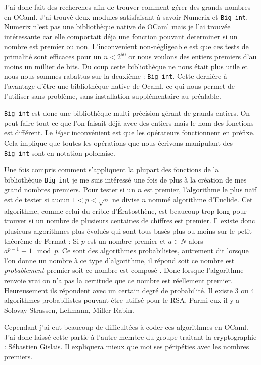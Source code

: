 \documentclass[a4paper,12pt]{article}
\begin{document}
J'ai donc fait des recherches afin de trouver comment gérer des grands nombres en OCaml. J'ai trouvé deux modules satisfaisant à savoir Numerix et \texttt{Big\_int}. Numerix n'est pas une bibliothèque native de OCaml mais je l'ai trouvée intéressante car elle comportait déja une fonction pouvant determiner si un nombre est premier ou non. L'inconvenient non-négligeable est que ces tests de primalité sont efficaces pour un $n < 2^{50}$ or nous voulons des entiers premiers d'au moins un millier de bits. Du coup cette bibliothèque ne nous était plus utile et nous nous sommes rabattus sur la deuxième : \texttt{Big\_int}. Cette dernière à l'avantage d'être une bibliothèque native de Ocaml, ce qui nous permet de l'utiliser sans problème, sans installation supplémentaire au préalable.

\texttt{Big\_int} est donc une bibliothèque multi-précision gérant de grands entiers. On peut faire tout ce que l'on faisait déjà avec des entiers mais le nom des fonctions est différent. Le \emph{léger} inconvénient est que les opérateurs fonctionnent en préfixe. Cela implique que toutes les opérations que nous écrivons manipulant des \texttt{Big\_int} sont en notation polonaise.

Une fois compris comment s'appliquent la plupart des fonctions de la bibliothèque \texttt{Big\_int} je me suis intéressé une fois de plus à la création de mes grand nombres premiers. Pour tester si un $n$ est premier, l'algorithme le plus naïf est de tester si aucun $1 < p < \sqrt{n}$ ne divise $n$ nommé algorithme d'Euclide. Cet algorithme, comme celui  du crible d'Ératosthène, est beaucoup trop long pour trouver si un nombre de plusieurs centaines de chiffres est premier. Il existe donc plusieurs algorithmes plus évolués qui sont tous basés plus ou moins sur le petit théorème de Fermat : Si $p$ est un nombre premier et $a \in N $ alors $a^{p - 1} \equiv 1 \mod p$. Ce sont des algorithmes probabilistes, autrement dit lorsque l'on donne un nombre à ce type d'algorithme, il répond soit \og ce nombre est \emph{probablement} premier \fg{} soit \og ce nombre est composé \fg{}. Donc lorsque l'algorithme renvoie vrai on n'a pas la certitude que ce nombre est réellement premier. Heureusement ils répondent avec un certain degré de probabilité. Il existe 3 ou 4 algorithmes probabilistes pouvant être utilisé pour le RSA. Parmi eux il y a Solovay-Strassen, Lehmann, Miller-Rabin.

Cependant j'ai eut beaucoup de difficultées à coder ces algorithmes en OCaml. J'ai donc laissé cette partie à l'autre membre du groupe traitant la cryptographie : Sébastien Gislais. Il expliquera mieux que moi ses péripéties avec les nombres premiers.
\end{document}
